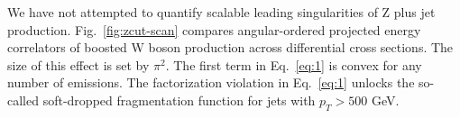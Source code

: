 We have not attempted to quantify scalable leading singularities of Z
plus jet production. Fig.~\ref{fig:zcut-scan} compares angular-ordered
projected energy correlators of boosted W boson production across
differential cross sections. The size of this effect is set by $\pi^2$.
The first term in Eq.~\eqref{eq:1} is convex for any number of
emissions. The factorization violation in Eq.~\eqref{eq:1} unlocks the
so-called soft-dropped fragmentation function for jets with $p_T > 500$
GeV.

